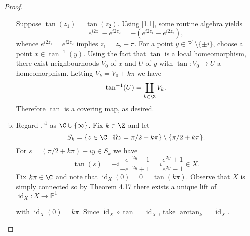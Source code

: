 \documentclass[10pt]{amsart}
\begin{document}
\begin{thm}
\begin{proof}
\begin{enumerate}[(a)]
      Suppose $\tan(z_1) = \tan(z_2)$.
      Using \eqref{1.1}, some routine algebra yields 
      $$e^{i2z_1} - e^{i2z_2} = -(e^{i2z_1} - e^{i2z_2}),$$
      whence $e^{i2z_1} = e^{i2z_2}$ implies $z_1 = z_2 + \pi$.
      For a point $y \in \mathbb{P}^1 \setminus \{\pm i\}$, choose a point $x \in \tan^{-1}(y)$.
      Using the fact that $\tan$ is a local homeomorphism, there exist neighbourhoods $V_0$ of $x$ and $U$ of $y$ with $\tan \colon V_0 \rightarrow U$ a homeomorphism.
      Letting $V_k = V_0 + k\pi$ we have
      $$\tan^{-1}(U) = \coprod_{k \in \Z} V_k.$$
      Therefore $\tan$ is a covering map, as desired.
    \item
      Regard $\mathbb{P}^1$ as $\C \cup \{\infty\}$.
      Fix $k \in \Z$ and let 
      $$S_k = \left\{z \in \C \;\middle\vert\; \Re{z} = \pi/2 + k\pi\right\} \setminus \{\pi/2 + k\pi\}.$$
      For $s = (\pi/2 + k\pi) + iy \in S_k$ we have
      $$\tan(s) = -i\frac{-e^{-2y} - 1}{-e^{-2y} + 1} = i \frac{e^{2y} + 1}{e^{2y} - 1} \in X.$$
      Fix $k\pi \in \C$ and note that $\operatorname{id}_X(0) = 0 = \tan(k\pi)$.
      Observe that $X$ is simply connected so by Theorem 4.17 there exists a unique lift of $\operatorname{id}_X \colon X \rightarrow \mathbb{P}^1$
      \begin{center}
      \end{center}
      with $\tilde{\operatorname{id}_X}(0) = k\pi$.
      Since $\tilde{\operatorname{id}}_X \circ \tan = \operatorname{id}_X$, take $\arctan_k = \tilde{\operatorname{id}}_X$.
    \end{enumerate}
  \end{proof}
\end{thm}
\end{document}

